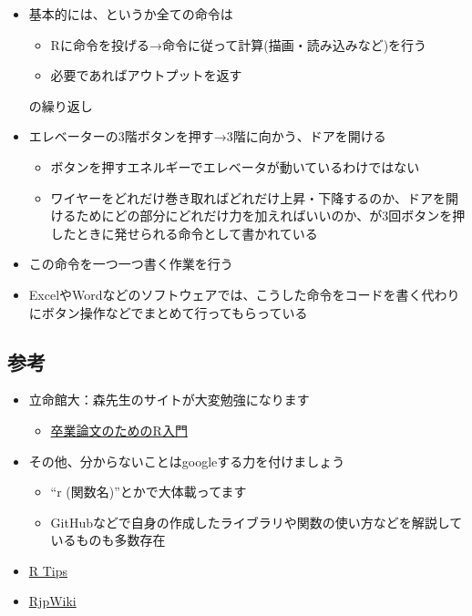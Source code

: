 \documentclass[
]{ltjsarticle}
\providecommand{\tightlist}{%
  \setlength{\itemsep}{0pt}\setlength{\parskip}{0pt}}
\begin{document}
\begin{itemize}
\item
  基本的には、というか全ての命令は

  \begin{itemize}
  \item
    Rに命令を投げる→命令に従って計算(描画・読み込みなど)を行う
  \item
    必要であればアウトプットを返す
  \end{itemize}

  の繰り返し
\item
  エレベーターの3階ボタンを押す→3階に向かう、ドアを開ける

  \begin{itemize}
  \tightlist
  \item
    ボタンを押すエネルギーでエレベータが動いているわけではない
  \item
    ワイヤーをどれだけ巻き取ればどれだけ上昇・下降するのか、ドアを開けるためにどの部分にどれだけ力を加えればいいのか、が3回ボタンを押したときに発せられる命令として書かれている
  \end{itemize}
\item
  この命令を一つ一つ書く作業を行う
\item
  ExcelやWordなどのソフトウェアでは、こうした命令をコードを書く代わりにボタン操作などでまとめて行ってもらっている
\end{itemize}

\hypertarget{ux53c2ux8003}{%
\subsection{参考}\label{ux53c2ux8003}}

\begin{itemize}
\tightlist
\item
  立命館大：森先生のサイトが大変勉強になります

  \begin{itemize}
  \tightlist
  \item
    \href{https://tomoecon.github.io/R_for_graduate_thesis/}{卒業論文のためのR入門}
  \end{itemize}
\item
  その他、分からないことはgoogleする力を付けましょう

  \begin{itemize}
  \tightlist
  \item
    ``r (関数名)''とかで大体載ってます
  \item
    GitHubなどで自身の作成したライブラリや関数の使い方などを解説しているものも多数存在
  \end{itemize}
\item
  \href{http://cse.naro.affrc.go.jp/takezawa/r-tips/r.html}{R Tips}
\item
  \href{http://www.okadajp.org/RWiki/}{RjpWiki}
\end{itemize}
\end{document}
